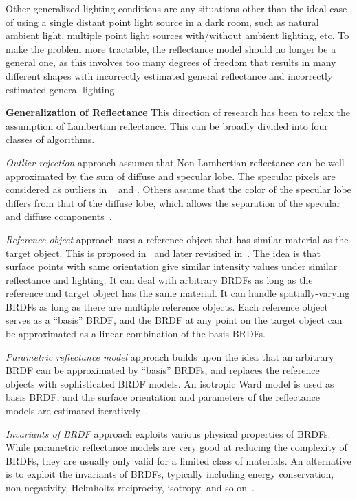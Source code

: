 Other generalized lighting conditions are any situations other than the ideal case of using a single distant point light source in a dark room, such as natural ambient light, multiple point light sources with/without ambient lighting, etc. To make the problem more tractable, the reflectance model should no longer be a general one, as this involves too many degrees of freedom that results in many different shapes with incorrectly estimated general reflectance and incorrectly estimated general lighting.

\textbf{Generalization of Reflectance} This direction of research has been to relax the assumption of Lambertian reflectance. This can be broadly divided into four classes of algorithms.

\textit{Outlier rejection} approach assumes that Non-Lambertian reflectance can be well approximated by the sum of diffuse and specular lobe. The specular pixels are considered as outliers in ~\cite{coleman1982obtaining} and \cite{barsky20034}. Others assume that the color of the specular lobe differs from that of the diffuse lobe, which allows the separation of the specular and diffuse components~\cite{mallick2005beyond,sato1994temporal,schluns1993photometric}.

\textit{Reference object} approach uses a reference object that has similar material as the target object. This is proposed in~\cite{silver1980determining} and later revisited in~\cite{hertzmann2005example}. The idea is that surface points with same orientation give similar intensity values under similar reflectance and lighting. It can deal with arbitrary BRDFs as long as the reference and target object has the same material. It can handle spatially-varying BRDFs as long as there are multiple reference objects. Each reference object serves as a ``basis'' BRDF, and the BRDF at any point on the target object can be approximated as a linear combination of the basis BRDFs.

\textit{Parametric reflectance model} approach builds upon the idea that an arbitrary BRDF can be approximated by ``basis'' BRDFs, and replaces the reference objects with sophisticated BRDF models. An isotropic Ward model is used as basis BRDF, and the surface orientation and parameters of the reflectance models are estimated iteratively~\cite{goldman2010shape}.

\textit{Invariants of BRDF} approach exploits various physical properties of BRDFs. While parametric reflectance models are very good at reducing the complexity of BRDFs, they are usually only valid for a limited class of materials. An alternative is to exploit the invariants of BRDFs, typically including energy conservation, non-negativity, Helmholtz reciprocity, isotropy, and so on~\cite{zickler2002helmholtz,alldrin2007toward}.

